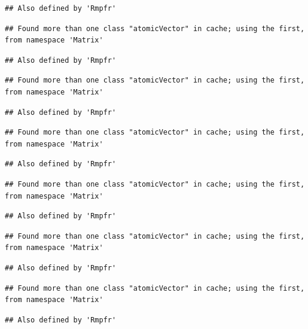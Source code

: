\documentclass[
]{article}
\begin{document}
\begin{verbatim}
## Also defined by 'Rmpfr'
\end{verbatim}

\begin{verbatim}
## Found more than one class "atomicVector" in cache; using the first, from namespace 'Matrix'
\end{verbatim}

\begin{verbatim}
## Also defined by 'Rmpfr'
\end{verbatim}

\begin{verbatim}
## Found more than one class "atomicVector" in cache; using the first, from namespace 'Matrix'
\end{verbatim}

\begin{verbatim}
## Also defined by 'Rmpfr'
\end{verbatim}

\begin{verbatim}
## Found more than one class "atomicVector" in cache; using the first, from namespace 'Matrix'
\end{verbatim}

\begin{verbatim}
## Also defined by 'Rmpfr'
\end{verbatim}

\begin{verbatim}
## Found more than one class "atomicVector" in cache; using the first, from namespace 'Matrix'
\end{verbatim}

\begin{verbatim}
## Also defined by 'Rmpfr'
\end{verbatim}

\begin{verbatim}
## Found more than one class "atomicVector" in cache; using the first, from namespace 'Matrix'
\end{verbatim}

\begin{verbatim}
## Also defined by 'Rmpfr'
\end{verbatim}

\begin{verbatim}
## Found more than one class "atomicVector" in cache; using the first, from namespace 'Matrix'
\end{verbatim}

\begin{verbatim}
## Also defined by 'Rmpfr'
\end{verbatim}
\end{document}
